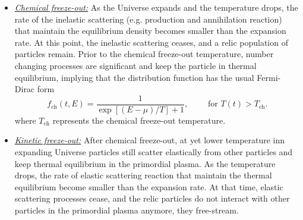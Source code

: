 \begin{itemize}
\item \underline{\it Chemical freeze-out:\/} 
As the Universe expands and the temperature drops, the rate of the inelastic scattering (e.g. production and annihilation reaction) that maintain the equilibrium density becomes smaller than the expansion rate. At this point, the inelastic scattering ceases, and a relic population of particles remain. Prior to the chemical freeze-out temperature, number changing processes are significant and keep the particle in thermal equilibrium, implying that the distribution function has the usual Fermi-Dirac  form 
\begin{equation}\label{equilibrium}
f_\mathrm{ch}(t,E)=\frac{1}{\exp[(E-\mu)/T]+1},\qquad \text{ for } T(t)> T_\mathrm{ch}.
\end{equation}
where $T_\mathrm{ch}$ represents the chemical freeze-out temperature. 
%
\item \underline{\it Kinetic freeze-out:\/}
After chemical freeze-out, at yet lower temperature inn expanding Universe particles still scatter elastically from other particles and keep thermal equilibrium in the primordial plasma. As the temperature drops, the rate of elastic scattering reaction that maintain the thermal equilibrium become smaller than the expansion rate. At that time, elastic scattering processes cease, and the relic particles do not interact with other particles in the primordial plasma anymore, they free-stream. 


\end{itemize}
